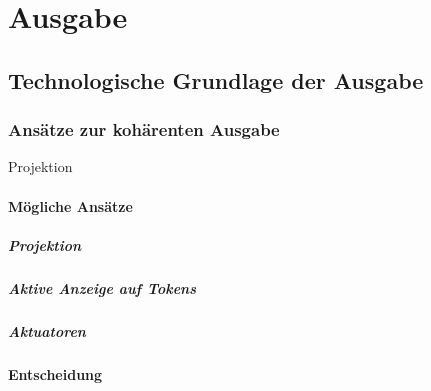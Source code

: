 \chapter{Ausgabe} %
\label{cha:visualisierung}

\section{Technologische Grundlage der Ausgabe} %
\label{sec:technologische_grundlage_der_visualisierung}

\subsection{Ansätze zur kohärenten Ausgabe} %
\label{sub:kohärente_ausgabe}
Projektion

\subsubsection{Mögliche Ansätze} %
\label{ssub:mögliche_ansätze}


\paragraph{Projektion} %
\label{par:projektion}


\paragraph{Aktive Anzeige auf Tokens} %
\label{par:aktive_anzeige_auf_tokens}


\paragraph{Aktuatoren} %
\label{par:aktuatoren}


\subsubsection{Entscheidung} %
\label{ssub:output_ansatz_entscheidung}


